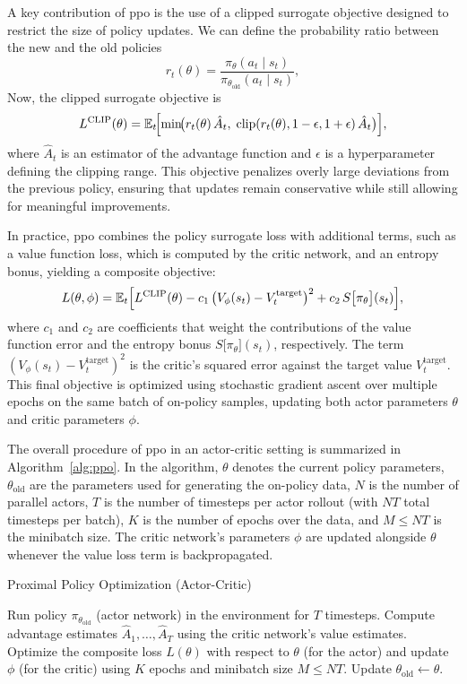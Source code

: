 A key contribution of \gls{ppo} is the use of a clipped surrogate objective designed to restrict the size of policy updates. We can define the probability ratio between the new and the old policies
\[
r_t(\theta) = \frac{\pi_\theta(a_t\mid s_t)}{\pi_{\theta_{\text{old}}}(a_t\mid s_t)},
\]
Now, the clipped surrogate objective is
\[
L^{\text{CLIP}}(\theta) = \mathbb{E}_t\!\Bigl[\min\!\bigl(r_t(\theta)\,\hat{A}_t,\;\text{clip}(r_t(\theta),1-\epsilon,1+\epsilon)\,\hat{A}_t\bigr)\Bigr],
\]
where \(\hat{A}_t\) is an estimator of the advantage function and \(\epsilon\) is a hyperparameter defining the clipping range. This objective penalizes overly large deviations from the previous policy, ensuring that updates remain conservative while still allowing for meaningful improvements.

In practice, \gls{ppo} combines the policy surrogate loss with additional terms, such as a value function loss, which is computed by the critic network, and an entropy bonus, yielding a composite objective:
\[
L(\theta,\phi) = \mathbb{E}_t\Bigl[L^{\text{CLIP}}(\theta)
  - c_1\,\bigl(V_\phi(s_t) - V_t^{\text{target}}\bigr)^2
  + c_2\,S\bigl[\pi_\theta\big](s_t)\Bigr],
\]
where \(c_1\) and \(c_2\) are coefficients that weight the contributions of the value function error and the entropy bonus \(S\big[\pi_\theta\big](s_t)\), respectively. The term \(\left(V_\phi(s_t) - V_t^{\text{target}}\right)^2\) is the critic's squared error against the target value \(V_t^{\text{target}}\). This final objective is optimized using stochastic gradient ascent over multiple epochs on the same batch of on-policy samples, updating both actor parameters \(\theta\) and critic parameters \(\phi\).

The overall procedure of \gls{ppo} in an actor-critic setting is summarized in Algorithm~\ref{alg:ppo}. In the algorithm, \(\theta\) denotes the current policy parameters, \(\theta_{\text{old}}\) are the parameters used for generating the on-policy data, \(N\) is the number of parallel actors, \(T\) is the number of timesteps per actor rollout (with \(NT\) total timesteps per batch), \(K\) is the number of epochs over the data, and \(M \le NT\) is the minibatch size. The critic network's parameters \(\phi\) are updated alongside \(\theta\) whenever the value loss term is backpropagated.

\begin{algorithm}[H]
\caption{Proximal Policy Optimization (Actor-Critic)}
\label{alg:ppo}
\begin{algorithmic}[1]
        \State Run policy \(\pi_{\theta_{\text{old}}}\) (actor network) in the environment for \(T\) timesteps.
        \State Compute advantage estimates \(\hat{A}_1, \dots, \hat{A}_T\) using the critic network's value estimates.
    \EndFor
    \State Optimize the composite loss \(L(\theta)\) with respect to \(\theta\) (for the actor) and update \(\phi\) (for the critic) using \(K\) epochs and minibatch size \(M \le NT\).
    \State Update \(\theta_{\text{old}} \leftarrow \theta\).
\EndFor
\end{algorithmic}
\end{algorithm}

